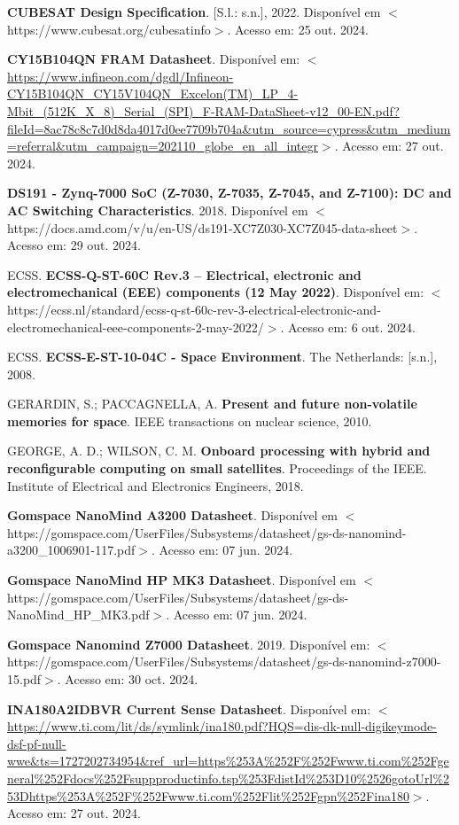 \begin{flushleft}
\begin{thebibliography}{00}
 \textbf{CUBESAT Design Specification}. [S.l.: s.n.], 2022. Disponível em $<$https://www.cubesat.org/cubesatinfo$>$. Acesso em: 25 out. 2024.

 \textbf{CY15B104QN FRAM Datasheet}. Disponível em: $<$\url{https://www.infineon.com/dgdl/Infineon-CY15B104QN\_CY15V104QN\_Excelon(TM)\_LP\_4-Mbit\_(512K\_X\_8)\_Serial\_(SPI)\_F-RAM-DataSheet-v12\_00-EN.pdf?fileId=8ac78c8c7d0d8da4017d0ee7709b704a\&utm\_source=cypress\&utm\_medium=referral\&utm\_campaign=202110\_globe\_en\_all\_integr}$>$. Acesso em: 27 out. 2024.

 \textbf{DS191 - Zynq-7000 SoC (Z-7030, Z-7035, Z-7045, and Z-7100): DC and AC Switching Characteristics}. 2018. Disponível em $<$https://docs.amd.com/v/u/en-US/ds191-XC7Z030-XC7Z045-data-sheet$>$. Acesso em: 29 out. 2024.

 ECSS. \textbf{ECSS-Q-ST-60C Rev.3 – Electrical, electronic and electromechanical (EEE) components (12 May 2022)}. Disponível em: $<$https://ecss.nl/standard/ecss-q-st-60c-rev-3-electrical-electronic-and-electromechanical-eee-components-2-may-2022/$>$. Acesso em: 6 out. 2024.

 ECSS. \textbf{ECSS-E-ST-10-04C - Space Environment}. The Netherlands: [s.n.], 2008.

 GERARDIN, S.; PACCAGNELLA, A. \textbf{Present and future non-volatile memories for space}. IEEE transactions on nuclear science, 2010.

 GEORGE, A. D.; WILSON, C. M. \textbf{Onboard processing with hybrid and reconfigurable computing on small satellites}. Proceedings of the IEEE. Institute of Electrical and Electronics Engineers, 2018.

 \textbf{Gomspace NanoMind A3200 Datasheet}. Disponível em $<$https://gomspace.com/UserFiles/Subsystems/datasheet/gs-ds-nanomind-a3200\_1006901-117.pdf$>$. Acesso em: 07 jun. 2024.

 \textbf{Gomspace NanoMind HP MK3 Datasheet}. Disponível em $<$https://gomspace.com/UserFiles/Subsystems/datasheet/gs-ds-NanoMind\_HP\_MK3.pdf$>$. Acesso em: 07 jun. 2024.

 \textbf{Gomspace Nanomind Z7000 Datasheet}. 2019. Disponível em: $<$https://gomspace.com/UserFiles/Subsystems/datasheet/gs-ds-nanomind-z7000-15.pdf$>$. Acesso em: 30 oct. 2024.

 \textbf{INA180A2IDBVR Current Sense Datasheet}. Disponível em: $<$\url{https://www.ti.com/lit/ds/symlink/ina180.pdf?HQS=dis-dk-null-digikeymode-dsf-pf-null-wwe\&ts=1727202734954\&ref\_url=https\%253A\%252F\%252Fwww.ti.com\%252Fgeneral\%252Fdocs\%252Fsuppproductinfo.tsp\%253FdistId\%253D10\%2526gotoUrl\%253Dhttps\%253A\%252F\%252Fwww.ti.com\%252Flit\%252Fgpn\%252Fina180}$>$. Acesso em: 27 out. 2024. 


\end{thebibliography}
\end{flushleft}
